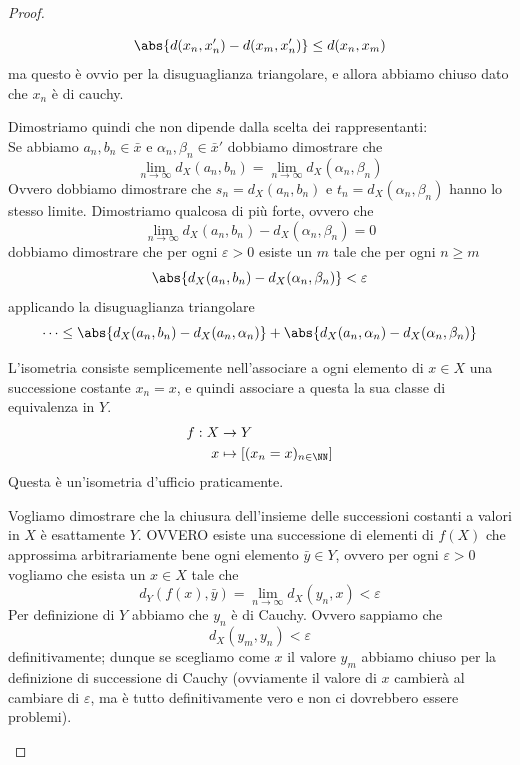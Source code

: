 \documentclass[11pt]{scrartcl}
\begin{document}
\begin{proof}
\begin{subproof}[Passo 2]
\begin{subproof}
  				$$\abs{d(x_n,x'_n)-d(x_m,x'_n)}\le d(x_n,x_m)$$
  				ma questo è ovvio per la disuguaglianza triangolare, e allora abbiamo chiuso dato che $x_n$ è di cauchy.
  			\end{subproof}
  			Dimostriamo quindi che non dipende dalla scelta dei rappresentanti: \\
  			Se abbiamo $a_n,b_n\in \bar{x}$ e $\alpha_n,\beta_n \in \bar{x}'$ dobbiamo dimostrare che 
  			$$\lim_{n\to \infty}d_X(a_n,b_n)=\lim_{n\to\infty}d_X(\alpha_n,\beta_n)$$
  			Ovvero dobbiamo dimostrare che $s_n=d_X(a_n,b_n)$ e $t_n=d_X(\alpha_n,\beta_n)$ hanno lo stesso limite. Dimostriamo qualcosa di più forte, ovvero che 
  			$$\lim_{n\to\infty}d_X(a_n,b_n)-d_X(\alpha_n,\beta_n)=0$$
  			dobbiamo dimostrare che per ogni $\varepsilon>0$ esiste un $m$ tale che per ogni $n\ge m$
  			$$\abs{d_X(a_n,b_n)-d_X(\alpha_n,\beta_n)}<\varepsilon$$
  			applicando la disuguaglianza triangolare
  			$$\dots \le \abs{d_X(a_n,b_n)-d_X(a_n,\alpha_n)}+\abs{d_X(a_n,\alpha_n)-d_X(\alpha_n,\beta_n)}$$
  		\end{subproof}
  		\begin{subproof}[Passo 3]
  			L'isometria consiste semplicemente nell'associare a ogni elemento di $x\in X$ una successione costante $x_n=x$, e quindi associare a questa la sua classe di equivalenza in $Y$.
  			\begin{align}\notag
  				f:X & \to Y \\ \notag
  				x &\mapsto [(x_n=x)_{n\in\NN}]
  			\end{align}
  			Questa è un'isometria d'ufficio praticamente.
  		\end{subproof}
  		\begin{subproof}[Passo 4]
  			Vogliamo dimostrare che la chiusura dell'insieme delle successioni costanti a valori in $X$ è esattamente $Y$. OVVERO esiste una successione di elementi di $f(X)$ che approssima arbitrariamente bene ogni elemento $\bar{y}\in Y$, ovvero per ogni $\varepsilon>0$ vogliamo che esista un $x\in X$ tale che 
  			$$d_Y(f(x),\bar{y})=\lim_{n\to\infty}d_X(y_n,x)<\varepsilon$$
  			Per definizione di $Y$ abbiamo che $y_n$ è di Cauchy. Ovvero sappiamo che 
  			$$d_X(y_m,y_n)<\varepsilon$$
  			definitivamente; dunque se scegliamo come $x$ il valore $y_m$ abbiamo chiuso per la definizione di successione di Cauchy (ovviamente il valore di $x$ cambierà al cambiare di $\varepsilon$, ma è tutto definitivamente vero e non ci dovrebbero essere problemi). 
  		\end{subproof}
  		\begin{subproof}[Passo 5]

\end{subproof}
\end{proof}
\end{document}
